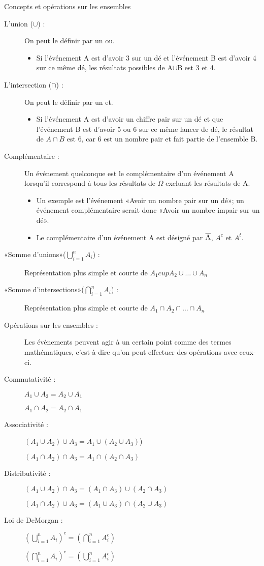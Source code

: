 \documentclass[10pt, french]{article}
\begin{document}
\begin{multicols*}{3}
\begin{probch2}{Concepts et opérations sur les ensembles}
\begin{description}
  \item[L'union ({$\cup$}) :] On peut le définir par un ou. 
  	\begin{itemize}
  	\item	Si l'événement A est d'avoir 3 sur un dé et l'événement B est d'avoir 4 sur ce même dé, les résultats possibles de A{$\cup$}B est 3 et 4.
  	\end{itemize}
  \item[L'intersection ({$\cap$}) :] On peut le définir par un et. 
  	\begin{itemize}
  	\item	Si l'événement A est d'avoir un chiffre pair sur un dé et que l'événement B est d'avoir 5 ou 6 sur ce même lancer de dé, le résultat de $A \cap B$ est 6, car 6 est un nombre pair et fait partie de l'ensemble B. 
  	\end{itemize}
  \item[Complémentaire :] Un événement quelconque est le complémentaire d'un événement A lorsqu'il correspond à tous les résultats de $\Omega$ excluant les résultats de A. 
  	\begin{itemize}
  	\item	Un exemple est l'événement «Avoir un nombre pair sur un dé»; un événement complémentaire serait donc «Avoir un nombre impair sur un dé». 
  	\item	Le complémentaire d'un événement A est désigné par {$\overline{\rm A}$}, $A^{c}$ et $A^{t}$.
  	\end{itemize}
  \item[«Somme d'unions»($\bigcup_{i=1}^{n} A_i$) :] Représentation plus simple et courte de $A_1 cup A_2 \cup \dots \cup A_n$
  \item[«Somme d'intersections»($\bigcap_{i=1}^{n} A_i$) :] Représentation plus simple et courte de $A_1 \cap A_2 \cap \dots \cap A_n$
  \item[Opérations sur les ensembles :] Les événements peuvent agir à un certain point comme des termes mathématiques, c'est-à-dire qu'on peut effectuer des opérations avec ceux-ci.
  \item[Commutativité :] $A_1	\cup	A_2	=	A_2 \cup A_1$
  \item[] $A_1	\cap	A_2	=	A_2 \cap A_1$
  \item[Associativité :] $(A_1 \cup A_2)	\cup A_3	=	A_1 \cup		(A_2 \cup A_3)$)
  \item[] $(A_1 \cap A_2)	\cap A_3	=	A_1 \cap		(A_2 \cap A_3)$
  \item[Distributivité :] $(A_1 \cup A_2)	\cap A_3 = (A_1 \cap A_3) \cup (A_2 \cap A_3)$
  \item[] $(A_1 \cap A_2)	\cup A_3 = (A_1 \cup A_3) \cap (A_2 \cup A_3)$
  \item[Loi de DeMorgan :] $(\bigcup_{i = 1}^{n} A_{i})^{c} = (\bigcap_{i=1}^{n} A_i^{c})$
  \item[] $(\bigcap_{i = 1}^{n} A_{i})^{c} = (\bigcup_{i=1}^{n} A_i^{c})$
\end{description}
\end{probch2}


\end{multicols*}
\end{document}

